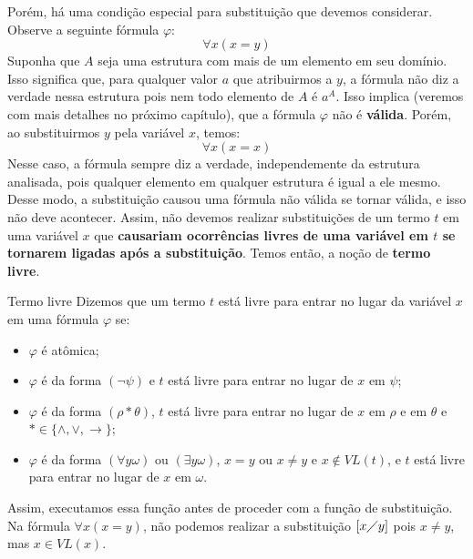Porém, há uma condição especial para substituição que devemos considerar. Observe a seguinte fórmula $\varphi$:
\[\forall x(x = y)\]
Suponha que $A$ seja uma estrutura com mais de um elemento em seu domínio. Isso significa que, para qualquer valor $a$ que atribuirmos a $y$, a fórmula não diz a verdade nessa estrutura pois nem todo elemento de $A$ é $a^A$. Isso implica (veremos com mais detalhes no próximo capítulo), que a fórmula $\varphi$ não é \textbf{válida}. Porém, ao substituirmos $y$ pela variável $x$, temos:
\[\forall x(x = x)\]
Nesse caso, a fórmula sempre diz a verdade, independemente da estrutura analisada, pois qualquer elemento em qualquer estrutura é igual a ele mesmo. Desse modo, a substituição causou uma fórmula não válida se tornar válida, e isso não deve acontecer. Assim, não devemos realizar substituições de um termo $t$ em uma variável $x$ que \textbf{causariam ocorrências livres de uma variável em $t$ se tornarem ligadas após a substituição}. Temos então, a noção de \textbf{termo livre}.
\begin{definition}{Termo livre}
    Dizemos que um termo $t$ está livre para entrar no lugar da variável $x$ em uma fórmula $\varphi$ se:
    \begin{itemize}
        \item $\varphi$ é atômica;
        \item $\varphi$ é da forma $(\neg \psi)$ e $t$ está livre para entrar no lugar de $x$ em $\psi$;
        \item $\varphi$ é da forma $(\rho * \theta)$, $t$ está livre para entrar no lugar de $x$ em $\rho$ e em $\theta$ e $* \in \{\land, \lor, \rightarrow\}$;
        \item $\varphi$ é da forma $(\forall y\omega)$ ou $(\exists y\omega)$, $x = y$ ou $x \neq y$ e $x \notin VL(t)$, e $t$ está livre para entrar no lugar de $x$ em $\omega$.
    \end{itemize}
\end{definition}
Assim, executamos essa função antes de proceder com a função de substituição. Na fórmula $\forall x(x = y)$, não podemos realizar a substituição $[x\diagup y]$ pois $x \neq y$, mas $x \in VL(x)$.